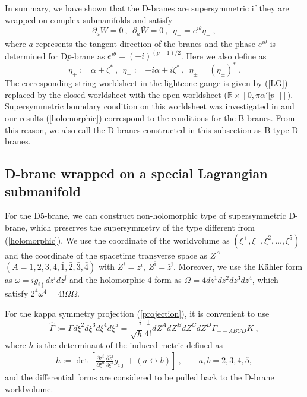 \documentclass[a4paper,12pt]{article}
\numberwithin{equation}{section}
\newcommand{\del}{\partial}
\newcommand{\ib}{\bar{\imath}}
\newcommand{\jb}{\bar{\jmath}}
\newcommand{\zb}{\bar{z}}
\newcommand{\Omegab}{\bar{\Omega}}
\newcommand{\deldel}[2]{\frac{\del #1}{\del #2}}
\begin{document}
In summary, we have shown that the D-branes are supersymmetric if they
are wrapped on complex submanifolds and satisfy
\begin{equation}
 \del_{a} W = 0 ~,~~  \del_{a} \bar W = 0 ~,~~ 
 \eta_{+} = e^{i\theta} \eta_{-} ~,
\label{holomorphic}
\end{equation}
where $a$ represents the tangent direction of the branes and 
the phase $e^{i\theta}$
is determined for D$p$-brane as $e^{i\theta}=(-i)^{(p-1)/2}$. 
Here we also define as
\begin{equation}
 \eta_{+} := \alpha + \zeta^* ~,~~ \eta_{-} := - i\alpha + i\zeta^* ~,
  ~~ \bar{\eta}_{\pm} = (\eta_{\pm})^* ~.
\label{eta}
\end{equation}
The corresponding string worldsheet in the lightcone gauge is given by
(\ref{LG}) replaced by the closed worldsheet with the open worldsheet
(${\mathbb R} \times [0,\pi \alpha' |p_-|]$).
Supersymmetric boundary condition on this worldsheet was investigated in
\cite{Hori:2000ck} and our
results (\ref{holomorphic}) correspond to the conditions for the B-branes.
{}From this reason, we also call the D-branes constructed in this subsection
as B-type D-branes.

\subsection{D-brane wrapped on a special Lagrangian submanifold}

For the D5-brane, we can construct non-holomorphic type of 
supersymmetric D-brane, which preserves the supersymmetry of the
type different from  (\ref{holomorphic}).
We use the coordinate of the worldvolume as 
$(\xi^{+},\xi^{-},\xi^{2},\dots,\xi^{5})$ and the coordinate of the
spacetime transverse space as $Z^{A}$
$(A=1,2,3,4,\bar 1,\bar 2,\bar 3,\bar 4)$ with
$Z^{i}=z^{i},\ Z^{\ib}=\zb^{\ib}$.
Moreover, we use the K\"ahler form as $\omega=ig_{i\jb}dz^{i}d\zb^{\jb}$
and the holomorphic 4-form as $\Omega=4dz^{1}dz^{2}dz^{3}dz^{4}$, which
satisfy $2^4 \omega^4=4!\Omega\Omegab$.

For the kappa symmetry projection (\ref{projection}), it is convenient
to use
\begin{equation}
 \hat{\Gamma}:=\Gamma d\xi^2 d\xi^3 d\xi^4 d\xi^5
        = \frac{- i}{\sqrt{h}}\frac{1}{4!}dZ^{A}dZ^{B}dZ^{C}dZ^{D}
       \Gamma_{+-ABCD}K ~,
\end{equation}
where $h$ is the determinant of the induced metric defined as
\begin{align}
   h:=\det \left[\deldel{z^{i}}{\xi^{a}} 
        \deldel{\zb^{\jb}}{\xi^{b}} g_{i \jb}+(a\leftrightarrow
 b)\right] ~,\qquad a,b=2,3,4,5,
\end{align}
and the differential forms are considered to be pulled back to the
D-brane worldvolume.
\end{document}
